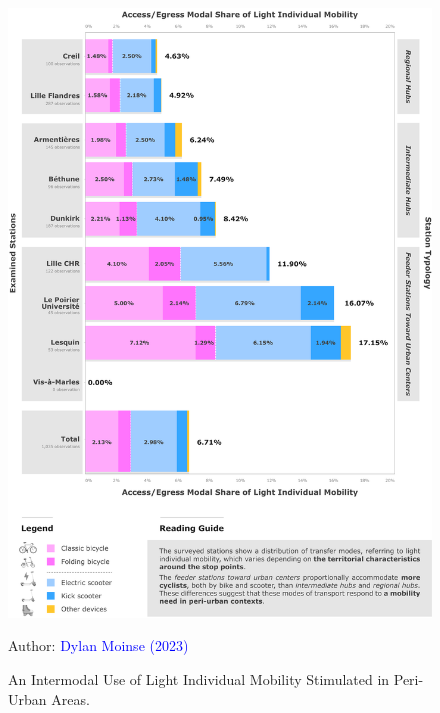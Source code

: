 \begin{refsegment}
\begin{figure}[h!]\vspace*{4pt}
    \caption{An Intermodal Use of Light Individual Mobility Stimulated in Peri-Urban Areas.}
    \label{fig-chap4:part-modale-urbain-periurbain}
    \centerline{\includegraphics[width=1\columnwidth]{src/Figures/Chap-4/EN_Part_modale_MIL_gares.pdf}}
    \vspace{5pt}
    \begin{flushright}\scriptsize{
    Author: \textcolor{blue}{Dylan Moinse (2023)}
    }\end{flushright}
\end{figure}


\end{refsegment}
